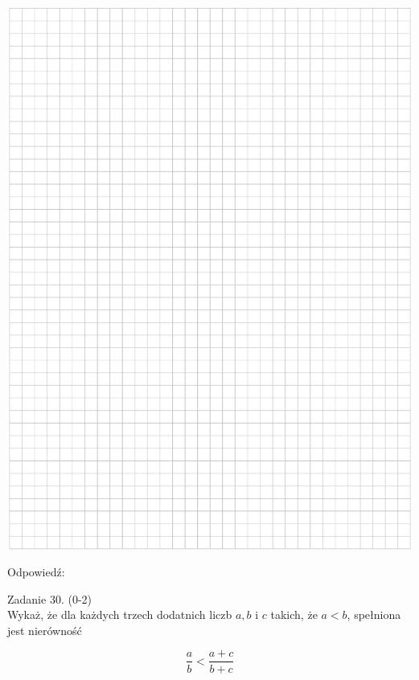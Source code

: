 \documentclass[10pt]{article}
\begin{document}
\begin{center}
\includegraphics[max width=\textwidth]{2024_11_21_46d945490f1b2eff1c8eg-16}
\end{center}

Odpowiedź:

Zadanie 30. (0-2)\\
Wykaż, że dla każdych trzech dodatnich liczb \(a, b\) i \(c\) takich, że \(a<b\), spełniona jest nierówność

\[
\frac{a}{b}<\frac{a+c}{b+c}
\]
\end{document}
